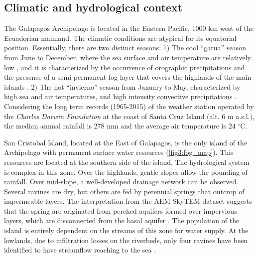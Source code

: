 \documentclass[a4paper,12pt]{article}
\begin{document}
\begin{linenumbers}
\subsection{Climatic and hydrological context}
The Galapagos Archipelago is located in the Eastern Pacific, $1000$ $\mathrm{km}$ west of the Ecuadorian mainland. The climatic conditions are atypical for its equatorial position. Essentially, there are two distinct seasons: 1) The cool “garua” season from June to December, where the sea surface and air temperature are relatively low \citep{PalmerandPyle1966, Dunbaretal1994}, and it is characterized by the occurrence of orographic precipitations and the presence of a semi-permanent fog layer that covers the highlands of the main islands \citep{TruemananddOzouville2010, Pryetetal2012a}. 2) The hot “invierno” season from January to May, characterized by high sea and air temperatures, and high intensity convective precipitations \citep{GrantandBoag1980, Dunbaretal1994, TruemananddOzouville2010}. Considering the long term records (1965-2015) of the weather station operated by the \emph{Charles Darwin Foundation} at the coast of Santa Cruz Island (alt. $6$ $\mathrm{m}$ a.s.l.), the median annual rainfall is $278$ $\mathrm{mm}$ and the average air temperature is $24$ $\mathrm{^{\circ}C}$.

San Cristobal Island, located at the East of Galapagos, is the only island of the Archipelago with permanent surface water resources (\autoref{fig3:fog_map}). This resources are located at the southern side of the island. The hydrological system is complex in this zone. Over the highlands, gentle slopes allow the pounding of rainfall. Over mid-slope, a well-developed drainage network can be observed. Several ravines are dry, but others are fed by perennial springs that outcrop of impermeable layers. The interpretation from the AEM SkyTEM dataset \cite{dOzouville2007} suggests that the spring are originated from perched aquifers formed over impervious layers, which are disconnected from the basal aquifer \citep{Pryetetal2012b, Violetteetal2014}. The population of the island is entirely dependent on the streams of this zone for water supply. At the lowlands, due to infiltration losses on the riverbeds, only four ravines have been identified to have streamflow reaching to the sea \citep{dOzouville2007}. 


\end{linenumbers}
\end{document}
